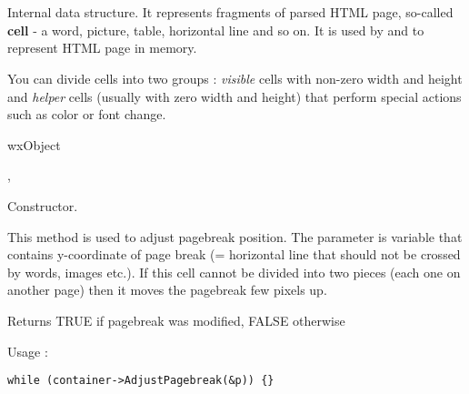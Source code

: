 %
%

\section{}\label{wxhtmlcell}

Internal data structure. It represents fragments of parsed HTML
page, so-called {\bf cell} - a word, picture, table, horizontal line and so on.
It is used by  and 
 to represent HTML page in memory.

You can divide cells into two groups : {\it visible} cells with non-zero width and
height and {\it helper} cells (usually with zero width and height) that
perform special actions such as color or font change.


wxObject


,


\label{wxhtmlcellwxhtmlcell}


Constructor.


\label{wxhtmlcelladjustpagebreak}


This method is used to adjust pagebreak position. The parameter is
variable that contains y-coordinate of page break (= horizontal line that
should not be crossed by words, images etc.). If this cell cannot be divided
into two pieces (each one on another page) then it moves the pagebreak
few pixels up.

Returns TRUE if pagebreak was modified, FALSE otherwise

Usage : 
\begin{verbatim}
while (container->AdjustPagebreak(&p)) {}
\end{verbatim}

\label{wxhtmlcelldraw}


